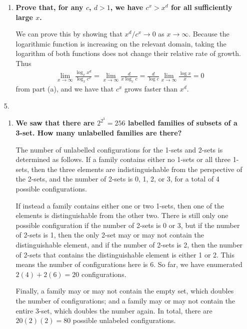 \documentclass[a4paper,12pt]{article}
\begin{document}
\begin{enumerate}
\begin{enumerate}
            \item
                \boldmath
                \textbf{Prove that, for any $c$, $d > 1$, we have $c^x > x^d$ for all sufficiently large $x$.} \par
                \unboldmath
                We can prove this by showing that $x^d / c^x \to 0$ as $x \to \infty$. Because the logarithmic function is increasing on the relevant domain, taking the logarithm of both functions does not change their relative rate of growth. Thus
                \begin{align*}
                    \lim_{x \to \infty} \frac{\log_x x^d}{\log_x c^x} = \lim_{x \to \infty} \frac{d}{x \log_x c} = \frac{d}{\log c} \lim_{x \to \infty} \frac{\log x}{x} = 0
                \end{align*}
                from part (a), and we have that $c^x$ grows faster than $x^d$.
        \end{enumerate}

    \item[5.]
        \begin{enumerate}
            \item
                \boldmath
                \textbf{We saw that there are $2^{2^3} = 256$ labelled families of subsets of a 3-set. How many unlabelled families are there?} \par
                \unboldmath
                The number of unlabelled configurations for the 1-sets and 2-sets is determined as follows. If a family contains either no 1-sets or all three 1-sets, then the three elements are indistinguishable from the perspective of the 2-sets, and the number of 2-sets is 0, 1, 2, or 3, for a total of 4 possible configurations. \par
                If instead a family contains either one or two 1-sets, then one of the elements is distinguishable from the other two. There is still only one possible configuration if the number of 2-sets is 0 or 3, but if the number of 2-sets is 1, then the only 2-set may or may not contain the distinguishable element, and if the number of 2-sets is 2, then the number of 2-sets that contains the distinguishable element is either 1 or 2. This means the number of configurations here is 6. So far, we have enumerated $2(4) + 2(6) = 20$ configurations. \par
                Finally, a family may or may not contain the empty set, which doubles the number of configurations; and a family may or may not contain the entire 3-set, which doubles the number again. In total, there are $20(2)(2) = 80$ possible unlabeled configurations.


\end{enumerate}
\end{enumerate}
\end{document}

